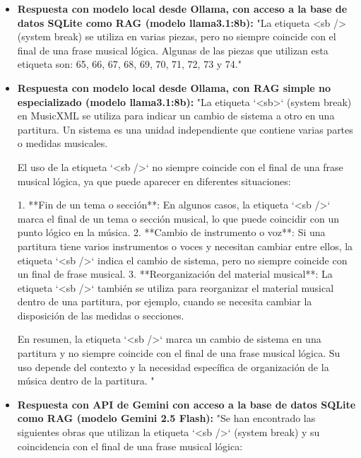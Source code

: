 \begin{itemize}
En resumen, la etiqueta `<sb />` (o `<print new-system=""yes""/>` en MusicXML) se utiliza para iniciar un nuevo sistema en la partitura. Si bien a menudo se alinea con el final de una frase musical o lírica para mejorar la legibilidad, su propósito principal es el control del diseño y no garantiza una coincidencia absoluta y universal con el final de cada frase musical lógica."
    \item \textbf{Respuesta con modelo local desde Ollama, con acceso a la base de datos SQLite como RAG (modelo llama3.1:8b):} "La etiqueta <sb /> (system break) se utiliza en varias piezas, pero no siempre coincide con el final de una frase musical lógica. Algunas de las piezas que utilizan esta etiqueta son: 65, 66, 67, 68, 69, 70, 71, 72, 73 y 74."
    \item \textbf{Respuesta con modelo local desde Ollama, con RAG simple no especializado (modelo llama3.1:8b):} "La etiqueta `<sb>` (system break) en MusicXML se utiliza para indicar un cambio de sistema a otro en una partitura. Un sistema es una unidad independiente que contiene varias partes o medidas musicales.

El uso de la etiqueta `<sb />` no siempre coincide con el final de una frase musical lógica, ya que puede aparecer en diferentes situaciones:

1. **Fin de un tema o sección**: En algunos casos, la etiqueta `<sb />` marca el final de un tema o sección musical, lo que puede coincidir con un punto lógico en la música.
2. **Cambio de instrumento o voz**: Si una partitura tiene varios instrumentos o voces y necesitan cambiar entre ellos, la etiqueta `<sb />` indica el cambio de sistema, pero no siempre coincide con un final de frase musical.
3. **Reorganización del material musical**: La etiqueta `<sb />` también se utiliza para reorganizar el material musical dentro de una partitura, por ejemplo, cuando se necesita cambiar la disposición de las medidas o secciones.

En resumen, la etiqueta `<sb />` marca un cambio de sistema en una partitura y no siempre coincide con el final de una frase musical lógica. Su uso depende del contexto y la necesidad específica de organización de la música dentro de la partitura.
"
\item \textbf{Respuesta con API de Gemini con acceso a la base de datos SQLite como RAG (modelo Gemini 2.5 Flash):} "Se han encontrado las siguientes obras que utilizan la etiqueta `<sb />` (system break) y su coincidencia con el final de una frase musical lógica:


\end{itemize}
